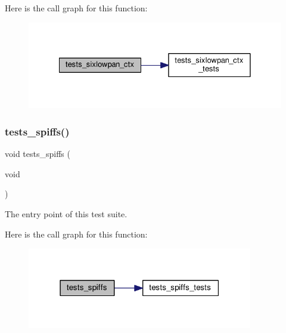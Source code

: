 Here is the call graph for this function\+:
\nopagebreak
\begin{figure}[H]
\begin{center}
\leavevmode
\includegraphics[width=328pt]{group__unittests_gaf9311b39cb1410823a35205c822900d9_cgraph}
\end{center}
\end{figure}
\mbox{\label{group__unittests_ga80de15b6e1bf2cc394a940d69830d042}} 
\subsubsection{\texorpdfstring{tests\+\_\+spiffs()}{tests\_spiffs()}}
{\footnotesize\ttfamily void tests\+\_\+spiffs (\begin{DoxyParamCaption}\item[{void}]{ }\end{DoxyParamCaption})}



The entry point of this test suite. 

Here is the call graph for this function\+:
\nopagebreak
\begin{figure}[H]
\begin{center}
\leavevmode
\includegraphics[width=279pt]{group__unittests_ga80de15b6e1bf2cc394a940d69830d042_cgraph}
\end{center}
\end{figure}
\mbox{\label{group__unittests_gad66683ae3365683aba4d469e07ce6799}} 
